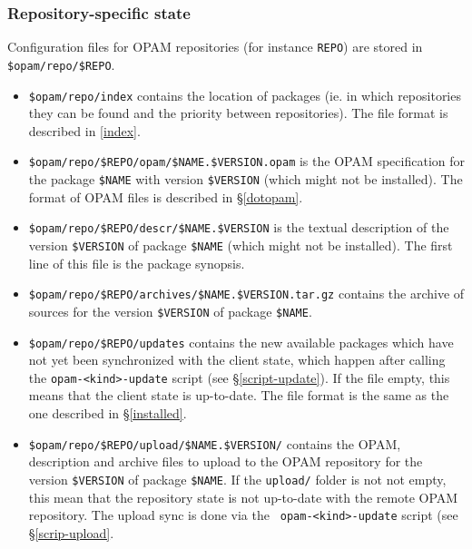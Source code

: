 \documentclass[a4paper,11pt]{article}
\begin{document}
\subsubsection{Repository-specific state}

Configuration files for OPAM repositories (for instance \verb+REPO+)
are stored in \verb+$opam/repo/$REPO+.

\begin{itemize}

\item \verb+$opam/repo/index+ contains the location of packages
  (ie. in which repositories they can be found and the priority
  between repositories). The file format is described in
  \ref{index}.

\item \verb+$opam/repo/$REPO/opam/$NAME.$VERSION.opam+ is the OPAM
  specification for the package \verb+$NAME+ with version
  \verb+$VERSION+ (which might not be installed). The format of OPAM
  files is described in \S\ref{dotopam}.

\item \verb+$opam/repo/$REPO/descr/$NAME.$VERSION+ is the textual
  description of the version \verb+$VERSION+ of package \verb+$NAME+
  (which might not be installed). The first line of this file is the
  package synopsis.

\item \verb+$opam/repo/$REPO/archives/$NAME.$VERSION.tar.gz+ contains
  the archive of sources for the version \verb+$VERSION+ of package
  \verb+$NAME+.

\item \verb+$opam/repo/$REPO/updates+ contains the new available
  packages which have not yet been synchronized with the client state,
  which happen after calling the {\tt opam-<kind>-update} script (see
  \S\ref{script-update}). If the file empty, this means that the
  client state is up-to-date. The file format is the same as the one
  described in \S\ref{installed}.

\item \verb+$opam/repo/$REPO/upload/$NAME.$VERSION/+ contains the
  OPAM, description and archive files to upload to the OPAM
  repository for the version \verb+$VERSION+ of package
  \verb+$NAME+. If the {\tt upload/} folder is not not empty, this
  mean that the repository state is not up-to-date with the remote
  OPAM repository. The upload sync is done via the {\tt
    opam-<kind>-update} script (see \S\ref{scrip-upload}.


\end{itemize}
\end{document}
